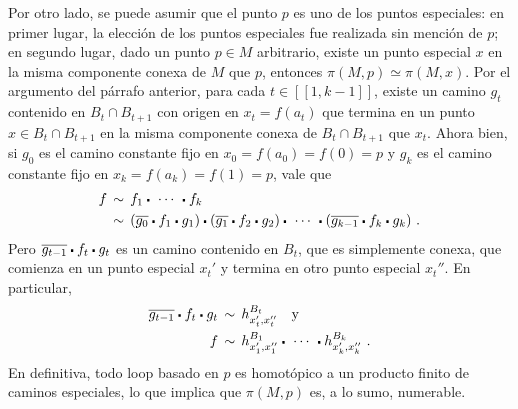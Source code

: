 Por otro lado, se puede asumir que el punto $p$ es uno de los puntos
especiales: en primer lugar, la elecci\'{o}n de los puntos especiales
fue realizada sin menci\'{o}n de $p$; en segundo lugar, dado un punto
$p\in M$ arbitrario, existe un punto especial $x$ en la misma componente
conexa de $M$ que $p$, entonces $\pi(M,p)\simeq\pi(M,x)$. Por el
argumento del p\'{a}rrafo anterior, para cada $t\in[\![1,k-1]\!]$,
existe un camino $g_{t}$ contenido en $B_{t}\cap B_{t+1}$ con origen en
$x_{t}=f(a_{t})$ que termina en un punto $x\in B_{t}\cap B_{t+1}$ en la
misma componente conexa de $B_{t}\cap B_{t+1}$ que $x_{t}$. Ahora bien,
si $g_{0}$ es el camino constante fijo en $x_{0}=f(a_{0})=f(0)=p$ y $g_{k}$
es el camino constante fijo en $x_{k}=f(a_{k})=f(1)=p$, vale que
\begin{align*}
	f & \,\sim\,f_{1}\sqcdot\,\cdots\,\sqcdot f_{k} \\
	& \,\sim\, (\reverse{g_{0}}\sqcdot f_{1}\sqcdot g_{1})\sqcdot
		(\reverse{g_{1}}\sqcdot f_{2}\sqcdot g_{2})\sqcdot
		\,\cdots\,\sqcdot (\reverse{g_{k-1}}\sqcdot f_{k}\sqcdot g_{k})
	\text{ .}
\end{align*}
%
Pero $\reverse{g_{t-1}}\sqcdot f_{t}\sqcdot g_{t}$ es un camino contenido en
$B_{t}$, que es simplemente conexa, que comienza en un punto especial
$x_{t}'$ y termina en otro punto especial $x_{t}''$. En particular,
\begin{align*}
	\reverse{g_{t-1}}\sqcdot f_{t}\sqcdot g_{t} &
		\,\sim\, h_{x_{t}',x_{t}''}^{B_{t}}\quad\text{y} \\
	f & \,\sim\, h_{x_{1}',x_{1}''}^{B_{1}}\sqcdot\,\cdots\,\sqcdot
		h_{x_{k}',x_{k}''}^{B_{k}}
	\text{ .}
\end{align*}
%
En definitiva, todo loop basado en $p$ es homot\'{o}pico a un producto
finito de caminos especiales, lo que implica que $\pi(M,p)$ es, a lo sumo,
numerable.

